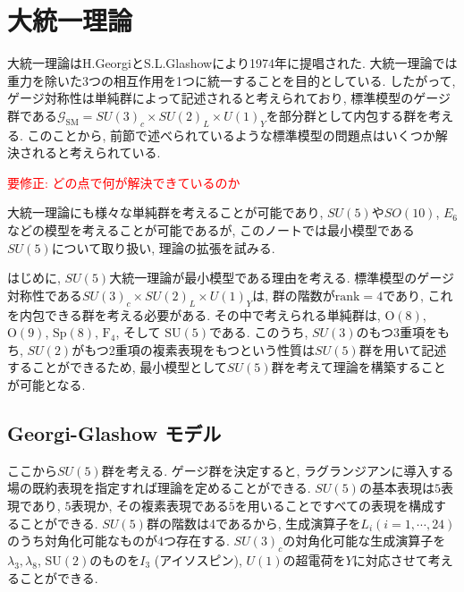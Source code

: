 % 
%

\section{大統一理論}
大統一理論はH.GeorgiとS.L.Glashowにより1974年に提唱された\cite{PhysRevLett.32.438}.
大統一理論では重力を除いた3つの相互作用を1つに統一することを目的としている.
したがって, ゲージ対称性は単純群によって記述されると考えられており, 標準模型のゲージ群である$\mathcal{G}_\text{SM}= SU(3)_c\times SU(2)_L\times U(1)_Y$を部分群として内包する群を考える.
このことから, 前節で述べられているような標準模型の問題点はいくつか解決されると考えられている.

\textcolor{red}{要修正: どの点で何が解決できているのか}

大統一理論にも様々な単純群を考えることが可能であり, $SU(5)$や$SO(10)$, $E_6$などの模型を考えることが可能であるが, このノートでは最小模型である$SU(5)$について取り扱い, 理論の拡張を試みる.

はじめに, $SU(5)$大統一理論が最小模型である理由を考える.
標準模型のゲージ対称性である$SU(3)_c\times SU(2)_L\times U(1)_Y$は, 群の階数が$\text{rank}=4$であり, これを内包できる群を考える必要がある.
その中で考えられる単純群は, $\text{O}(8)$, $\mathrm{O}(9)$, $\mathrm{Sp}(8)$, $\mathrm{F}_4$, そして $\mathrm{SU}(5)$である.
このうち, $SU(3)$のもつ3重項をもち, $SU(2)$がもつ2重項の複素表現をもつという性質は$SU(5)$群を用いて記述することができるため, 最小模型として$SU(5)$群を考えて理論を構築することが可能となる.

\subsection{Georgi-Glashow モデル}
ここから$SU(5)$群を考える.
ゲージ群を決定すると, ラグランジアンに導入する場の既約表現を指定すれば理論を定めることができる.
$SU(5)$の基本表現は$5$表現であり, $5$表現か, その複素表現である$\overline{5}$を用いることですべての表現を構成することができる.
$SU(5)$群の階数は4であるから, 生成演算子を$L_i$$(i=1,\cdots,24)$ のうち対角化可能なものが4つ存在する.
$SU(3)_c$の対角化可能な生成演算子を$\lambda_3,\lambda_8$, $\mathrm{SU}(2)$のものを$I_3$ (アイソスピン), $U(1)$の超電荷を$Y$に対応させて考えることができる.

